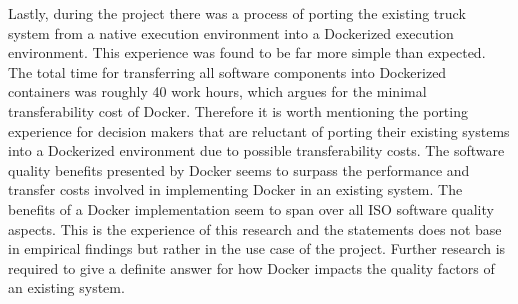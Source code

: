 Lastly, during the project there was a process of porting the existing truck system from a native execution environment into a Dockerized execution environment. This experience was found to be far more simple than expected. The total time for transferring all software components into Dockerized containers was roughly 40 work hours, which argues for the minimal transferability cost of Docker. Therefore it is worth mentioning the porting experience for decision makers that are reluctant of porting their existing systems into a Dockerized environment due to possible transferability costs. The software quality benefits presented by Docker seems to surpass the performance and transfer costs involved in implementing Docker in an existing system. The benefits of a Docker implementation seem to span over all ISO software quality aspects. This is the experience of this research and the statements does not base in empirical findings but rather in the use case of the project. Further research is required to give a definite answer for how Docker impacts the quality factors of an existing system.\\